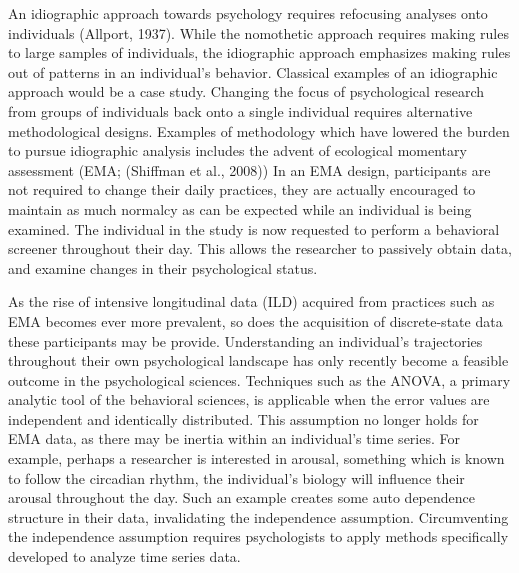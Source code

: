 \documentclass[12pt]{./styles/outhesis}
\begin{document}
An idiographic approach towards psychology requires refocusing analyses
onto individuals (Allport, 1937). While the nomothetic approach requires
making rules to large samples of individuals, the idiographic approach
emphasizes making rules out of patterns in an individual's behavior.
Classical examples of an idiographic approach would be a case study.
Changing the focus of psychological research from groups of individuals
back onto a single individual requires alternative methodological
designs. Examples of methodology which have lowered the burden to pursue
idiographic analysis includes the advent of ecological momentary
assessment (EMA; (Shiffman et al., 2008)) In an EMA design, participants
are not required to change their daily practices, they are actually
encouraged to maintain as much normalcy as can be expected while an
individual is being examined. The individual in the study is now
requested to perform a behavioral screener throughout their day. This
allows the researcher to passively obtain data, and examine changes in
their psychological status.

As the rise of intensive longitudinal data (ILD) acquired from practices such as EMA becomes ever more prevalent, so does the acquisition
of discrete-state data these participants may be provide. Understanding
an individual's trajectories throughout their own psychological
landscape has only recently become a feasible outcome in the
psychological sciences. Techniques such as the ANOVA, a primary analytic
tool of the behavioral sciences, is applicable when the error values are
independent and identically distributed. This assumption no longer holds
for EMA data, as there may be inertia within an individual's time
series. For example, perhaps a researcher is interested in arousal,
something which is known to follow the circadian rhythm, the
individual's biology will influence their arousal throughout the day.
Such an example creates some auto dependence structure in their data,
invalidating the independence assumption. Circumventing the independence
assumption requires psychologists to apply methods specifically
developed to analyze time series data.
\end{document}

